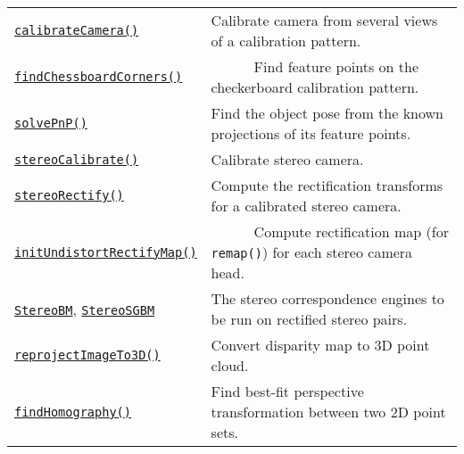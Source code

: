 \documentclass[10pt,landscape]{article}
\begin{document}
\begin{multicols}{3}
\begin{tabular}{@{}p{\the\MyLen}%
                @{}p{\linewidth-\the\MyLen}@{}}

\texttt{\href{http://docs.opencv.org/modules/calib3d/doc/camera_calibration_and_3d_reconstruction.html\#calibratecamera}{calibrateCamera()}} & Calibrate camera from several views of a calibration pattern. \\

\texttt{\href{http://docs.opencv.org/modules/calib3d/doc/camera_calibration_and_3d_reconstruction.html\#findchessboardcorners}{findChessboardCorners()}} & \ \ \ \ \ \ Find feature points on the checkerboard calibration pattern. \\

\texttt{\href{http://docs.opencv.org/modules/calib3d/doc/camera_calibration_and_3d_reconstruction.html\#solvepnp}{solvePnP()}} & Find the object pose from the known projections of its feature points. \\

\texttt{\href{http://docs.opencv.org/modules/calib3d/doc/camera_calibration_and_3d_reconstruction.html\#stereocalibrate}{stereoCalibrate()}} & Calibrate stereo camera. \\

\texttt{\href{http://docs.opencv.org/modules/calib3d/doc/camera_calibration_and_3d_reconstruction.html\#stereorectify}{stereoRectify()}} & Compute the rectification transforms for a calibrated stereo camera.\\

\texttt{\href{http://docs.opencv.org/modules/imgproc/doc/geometric_transformations.html\#initundistortrectifymap}{initUndistortRectifyMap()}} & \ \ \ \ \ \ Compute rectification map (for \texttt{remap()}) for each stereo camera head.\\

\texttt{\href{http://docs.opencv.org/modules/calib3d/doc/camera_calibration_and_3d_reconstruction.html\#StereoBM}{StereoBM}}, \texttt{\href{http://docs.opencv.org/modules/calib3d/doc/camera_calibration_and_3d_reconstruction.html\#StereoSGBM}{StereoSGBM}} & The stereo correspondence engines to be run on rectified stereo pairs.\\

\texttt{\href{http://docs.opencv.org/modules/calib3d/doc/camera_calibration_and_3d_reconstruction.html\#reprojectimageto3d}{reprojectImageTo3D()}} & Convert disparity map to 3D point cloud.\\

\texttt{\href{http://docs.opencv.org/modules/calib3d/doc/camera_calibration_and_3d_reconstruction.html\#findhomography}{findHomography()}} & Find best-fit perspective transformation between two 2D point sets. \\


\end{tabular}
\end{multicols}
\end{document}

